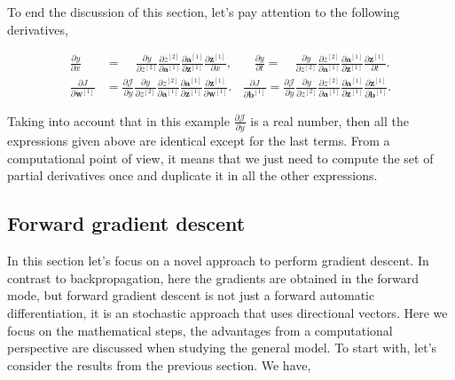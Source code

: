 \documentclass{article}
\begin{document}
To end the discussion of this section, let's pay attention to the following derivatives,

\begin{align}
\frac{\partial y}{\partial x} &= ~~~~~\frac{\partial y}{\partial z^{[2]}} \frac{\partial z^{[2]}}{\partial \textbf{a}^{[1]}} \frac{\partial \textbf{a}^{[1]}}{\partial \textbf{z}^{[1]}}  \frac{\partial \textbf{z}^{[1]}}{\partial x}, 
~~~~~~~~
\frac{\partial y}{\partial t} = ~~~~~\frac{\partial y}{\partial z^{[2]}} \frac{\partial z^{[2]}}{\partial \textbf{a}^{[1]}} \frac{\partial \textbf{a}^{[1]}}{\partial \textbf{z}^{[1]}}  \frac{\partial \textbf{z}^{[1]}}{\partial t}. \\
\frac{\partial J}{\partial \textbf{w}^{[1]}} &= \frac{\partial \mathcal{J}}{\partial y} \frac{\partial y}{\partial z^{[2]}} \frac{\partial z^{[2]}}{\partial \textbf{a}^{[1]}} \frac{\partial \textbf{a}^{[1]}}{\partial \textbf{z}^{[1]}}  \frac{\partial \textbf{z}^{[1]}}{\partial \textbf{w}^{[1]}}. 
~~~~
\frac{\partial J}{\partial \textbf{b}^{[1]}} =  \frac{\partial \mathcal{J}}{\partial y} \frac{\partial y}{\partial z^{[2]}} \frac{\partial z^{[2]}}{\partial \textbf{a}^{[1]}} \frac{\partial \textbf{a}^{[1]}}{\partial \textbf{z}^{[1]}}  \frac{\partial \textbf{z}^{[1]}}{\partial \textbf{b}^{[1]}}.
\end{align}

Taking into account that in this example $\frac{\partial \mathcal{J}}{\partial y}$ is a real number, then all the expressions given above are identical except for the last terms. From a computational point of view, it means that we just need to compute the set of partial derivatives once and duplicate it in all the other expressions.

\subsection{Forward gradient descent}
In this section let's focus on a novel approach to perform gradient descent. In contrast to backpropagation, here the gradients are obtained in the forward mode, but forward gradient descent is not just a forward automatic differentiation, it is an stochastic approach that uses directional vectors. Here we focus on the mathematical steps, the advantages from a computational perspective are discussed when studying the general model.
To start with, let's consider the results from the previous section. We have,
\end{document}
